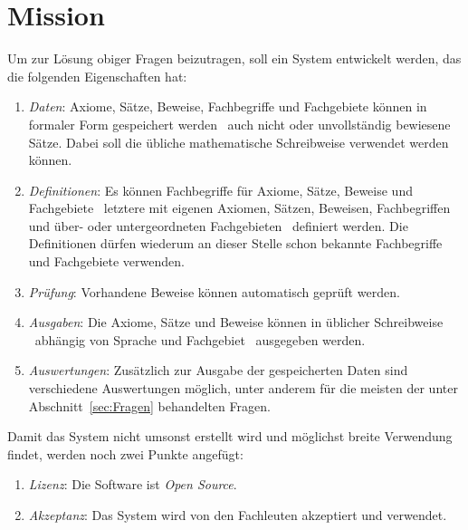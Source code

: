 \documentclass[english,ngerman,parskip=half,headsepline,footsepline]{scrreprt}
\newcounter{Enumi}
\newcommand{\sectionname}{Abschnitt}
\begin{document}
	\section{Mission} %
	\label{sec:Mission}

	Um zur Lösung obiger Fragen beizutragen, soll ein System entwickelt werden, das die folgenden Eigenschaften hat:

	\begin{enumerate}

		\item \label{Mission:Daten} \emph{Daten}: Axiome, Sätze, Beweise, Fachbegriffe und Fachgebiete können in formaler Form gespeichert werden \textendash\ auch nicht oder unvollständig bewiesene Sätze. Dabei soll die übliche mathematische Schreibweise verwendet werden können.

		\item \label{Mission:Definitionen} \emph{Definitionen}: Es können Fachbegriffe für Axiome, Sätze, Beweise und Fachgebiete \textendash\ letztere mit eigenen Axiomen, Sätzen, Beweisen, Fachbegriffen und über- oder untergeordneten Fachgebieten \textendash\ definiert werden. Die Definitionen dürfen wiederum an dieser Stelle schon bekannte Fachbegriffe und Fachgebiete verwenden.

		\item \label{Mission:Prüfung} \emph{Prüfung}: Vorhandene Beweise können automatisch geprüft werden.

		\item \label{Mission:Ausgaben} \emph{Ausgaben}: Die Axiome, Sätze und Beweise können in üblicher Schreibweise \textendash\ abhängig von Sprache und Fachgebiet \textendash\ ausgegeben werden.

		\item \label{Mission:Auswertungen} \emph{Auswertungen}: Zusätzlich zur Ausgabe der gespeicherten Daten sind verschiedene Auswertungen möglich, unter anderem für die meisten der unter \sectionname~\vref{sec:Fragen} behandelten Fragen.

		\setcounter{Enumi}{\value{enumi}}
	\end{enumerate}

	Damit das System nicht umsonst erstellt wird und möglichst breite Verwendung findet, werden noch zwei Punkte angefügt:

	\begin{enumerate}
		\setcounter{enumi}{\value{Enumi}}

		\item \label{Mission:Lizenz} \emph{Lizenz}: Die Software ist \emph{Open Source}.

		\item \label{Mission:Akzeptanz} \emph{Akzeptanz}: Das System wird von den Fachleuten akzeptiert und verwendet.

	\end{enumerate}
\end{document}
